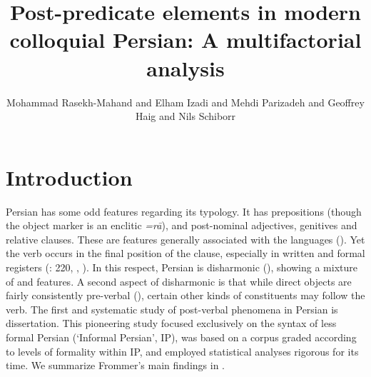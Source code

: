 \documentclass[output=paper,colorlinks,citecolor=brown,draftmode]{langscibook}
\author{Mohammad Rasekh-Mahand\orcid{}\affiliation{Bu-Ali Sina University, Hamadan} and Elham Izadi\affiliation{Bu-Ali Sina University, Hamadan} and Mehdi Parizadeh\affiliation{Bu-Ali Sina University, Hamadan} and Geoffrey Haig\orcid{0000-0002-5410-3692}\affiliation{Bamberg University} and Nils Schiborr\affiliation{Bamberg University}}
\title{Post-predicate elements in modern colloquial Persian: A multifactorial analysis}
\begin{document}
\maketitle\label{WOWA:ch:7}
\section{Introduction}

Persian has some odd features regarding its  typology. It has prepositions (though the object marker is an enclitic \textit{=rā}), and post-nominal adjectives, genitives and relative clauses. These are features generally associated with the  languages (\citealt{Dryer1992Greeburg}). Yet the verb occurs in the final position of the clause, especially in written and formal registers (\citealt{FaghiriSamvelian2014Accesibility}: 220, \citealt{HaigRasekhMahand2019}, \citealt{FaghiriSamvelian2020SOV}). In this respect, Persian  is disharmonic (\citealt{hawkins_asymmetry_2008}), showing a mixture of  and  features. A second aspect of disharmonic  is that while direct objects are fairly consistently pre-verbal (), certain other kinds of constituents may follow the verb. The first and systematic study of post-verbal phenomena in Persian is  dissertation. This pioneering study focused exclusively on the syntax of less formal Persian (`Informal Persian', IP), was based on a corpus graded according to levels of formality within IP, and employed statistical analyses rigorous for its time. We summarize Frommer's main findings in .
\end{document}
